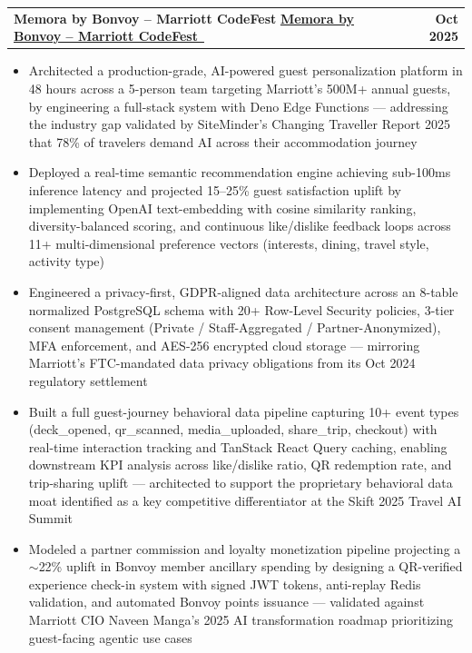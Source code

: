 \documentclass[letterpaper,11pt]{article}
\makeatletter
\newcommand{\resumeItem}[1]{
  \item\small{{#1 \vspace{-2pt}}}
}
\newcommand{\resumeProjectHeading}[4]{%
  \vspace{-2pt}\item
  \begin{tabular*}{1.001\textwidth}{l@{\extracolsep{\fill}}r}
    \small{%
      \ifthenelse{\equal{#1}{}}%
        {%
          \textbf{#2}%
          \ifthenelse{\equal{#3}{}}{}{ $|$ \emph{#3}}%
        }%
        {%
          \href{#1}{\underline{\textbf{#2}}~\faLink}%
          \ifthenelse{\equal{#3}{}}{}{ $|$ \emph{#3}}%
        }%
    } & \textbf{\small #4} \\
  \end{tabular*}\vspace{-7pt}
}
\newcommand{\resumeItemListStart}{\begin{itemize}}
\newcommand{\resumeItemListEnd}{\end{itemize}\vspace{-5pt}}
\makeatother
\begin{document}
        \resumeProjectHeading
            {https://memora-by-bonvoy.vercel.app/}
            {Memora by Bonvoy -- Marriott CodeFest}
            {React.js + Vite, TypeScript, Tailwind CSS, PostgreSQL}
            {Oct 2025}
            \resumeItemListStart
                \resumeItem{Architected a production-grade, AI-powered guest personalization platform in 48 hours across a 5-person team targeting Marriott's 500M+ annual guests, by engineering a full-stack system with Deno Edge Functions — addressing the industry gap validated by SiteMinder's Changing Traveller Report 2025 that 78\% of travelers demand AI across their accommodation journey}
                \resumeItem{Deployed a real-time semantic recommendation engine achieving sub-100ms inference latency and projected 15--25\% guest satisfaction uplift by implementing OpenAI text-embedding with cosine similarity ranking, diversity-balanced scoring, and continuous like/dislike feedback loops across 11+ multi-dimensional preference vectors (interests, dining, travel style, activity type)}
                \resumeItem{Engineered a privacy-first, GDPR-aligned data architecture across an 8-table normalized PostgreSQL schema with 20+ Row-Level Security policies, 3-tier consent management (Private / Staff-Aggregated / Partner-Anonymized), MFA enforcement, and AES-256 encrypted cloud storage — mirroring Marriott's FTC-mandated data privacy obligations from its Oct 2024 regulatory settlement}
                \resumeItem{Built a full guest-journey behavioral data pipeline capturing 10+ event types (deck\_opened, qr\_scanned, media\_uploaded, share\_trip, checkout) with real-time interaction tracking and TanStack React Query caching, enabling downstream KPI analysis across like/dislike ratio, QR redemption rate, and trip-sharing uplift — architected to support the proprietary behavioral data moat identified as a key competitive differentiator at the Skift 2025 Travel AI Summit}
                \resumeItem{Modeled a partner commission and loyalty monetization pipeline projecting a $\sim$22\% uplift in Bonvoy member ancillary spending by designing a QR-verified experience check-in system with signed JWT tokens, anti-replay Redis validation, and automated Bonvoy points issuance — validated against Marriott CIO Naveen Manga's 2025 AI transformation roadmap prioritizing guest-facing agentic use cases}
            \resumeItemListEnd
        \vspace{-10pt}
\end{document}
